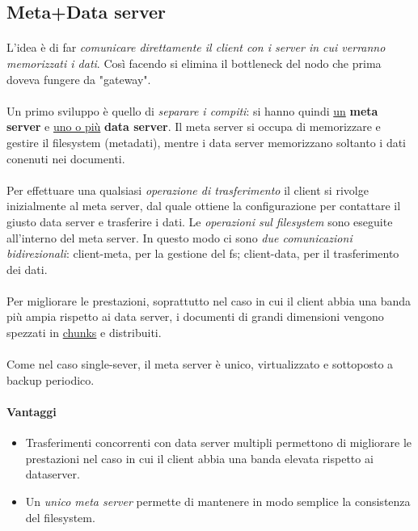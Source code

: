 \documentclass[11pt,a4paper,english]{article}
\begin{document}
\subsection{Meta+Data server}

\paragraph{} L'idea è di far \emph{comunicare direttamente il client con i server in cui verranno memorizzati i dati}. Così facendo si elimina il bottleneck del nodo che prima doveva fungere da "gateway". 

\paragraph{} Un primo sviluppo è quello di \emph{separare i compiti}: si hanno quindi \underline{un} \textbf{meta server} e \underline{uno o più} \textbf{data server}. Il meta server si occupa di memorizzare e gestire il filesystem (metadati), mentre i data server memorizzano soltanto i dati conenuti nei documenti. 

\paragraph{} Per effettuare una qualsiasi \emph{operazione di trasferimento} il client si rivolge inizialmente al meta server, dal quale ottiene la configurazione per contattare il giusto data server e trasferire i dati. Le \emph{operazioni sul filesystem} sono eseguite all'interno del meta server. In questo modo ci sono \emph{due comunicazioni bidirezionali}: client-meta, per la gestione del fs; client-data, per il trasferimento dei dati.

\paragraph{} Per migliorare le prestazioni, soprattutto nel caso in cui il client abbia una banda più ampia rispetto ai data server, i documenti di grandi dimensioni vengono spezzati in \underline{chunks} e distribuiti. 

\paragraph{} Come nel caso single-sever, il meta server è unico, virtualizzato e sottoposto a backup periodico. 

\paragraph{Vantaggi} \begin{itemize}
	\item Trasferimenti concorrenti con data server multipli permettono di migliorare le prestazioni nel caso in cui il client abbia una banda elevata rispetto ai dataserver.
	\item Un \emph{unico meta server} permette di mantenere in modo semplice la consistenza del filesystem.
\end{itemize}
\end{document}
